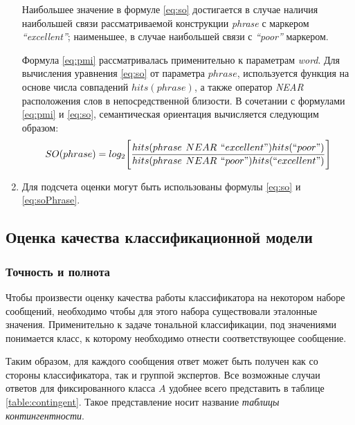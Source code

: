 \begin{enumerate}
                Наибольшее значение в формуле \ref{eq:so} достигается в случае
                наличия наибольшей связи рассматриваемой конструкции {\it phrase}
                с маркером {\it ``excellent''}; наименьшее, в случае наибольшей связи
                с {\it ``poor''} маркером.

                Формула \ref{eq:pmi} рассматривалась применительно к параметрам
                {\it word}. Для вычисления уравнения \ref{eq:so} от параметра
                $phrase$, используется функция на основе числа совпадений
                $hits(phrase)$, а также оператор {\it NEAR} расположения слов в
                непосредственной близости. В сочетании с формулами \ref{eq:pmi}
                и \ref{eq:so}, семантическая ориентация вычисляется следующим
                образом:
                \begin{equation}
                    \label{eq:soPhrase}
                    SO(phrase) = log_2 \Bigg[ \dfrac{hits(phrase \hspace{4pt} NEAR \hspace{4pt}``excellent\text{''})hits(``poor\text{''}) }{hits(phrase \hspace{4pt}NEAR \hspace{4pt}``poor\text{''})hits(``excellent\text{''})} \Bigg]
                \end{equation}

            \item Для подсчета оценки могут быть использованы формулы \ref{eq:so} и
                \ref{eq:soPhrase}.
        \end{enumerate}

    \subsection{Оценка качества классификационной модели}

        \subsubsection{Точность и полнота}
    Чтобы произвести оценку качества работы классификатора на некотором наборе
    сообщений, необходимо чтобы для этого набора существовали эталонные
    значения. Применительно к задаче тональной классификации, под значениями
    понимается класс, к которому необходимо отнести соответствующее сообщение.

    Таким образом, для каждого сообщения ответ может быть получен как со стороны
    классификатора, так и группой экспертов. Все возможные случаи ответов
    для фиксированного класса $A$ удобнее всего представить в таблице
    \ref{table:contingent}. Такое представление носит название
    {\it таблицы контингентности}.

